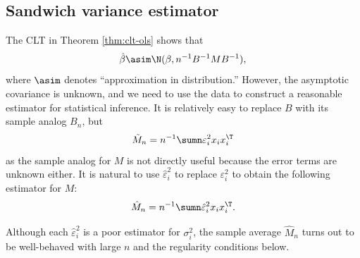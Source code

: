 \subsection{Sandwich variance estimator}
The CLT in Theorem \ref{thm:clt-ols} shows that 
\[
\hat{\beta}\asim\N(\beta,n^{-1}B^{-1}MB^{-1}),
\]
where $\asim$ denotes ``approximation in distribution.'' However,
the asymptotic covariance is unknown, and we need to use the data
to construct a reasonable estimator for statistical inference. It
is relatively easy to replace $B$ with its sample analog $B_{n}$,
but
\[
\tilde{M}_{n}=n^{-1}\sumn\varepsilon_{i}^{2}x_{i}x_{i}^{\T}
\]
as the sample analog for $M$ is not directly useful because the error
terms are unknown either. It is natural to use $\hat{\varepsilon}_{i}^{2}$
to replace $\varepsilon_{i}^{2}$ to obtain the following estimator
for $M$: 
\[
\hat{M}_{n}=n^{-1}\sumn\hat{\varepsilon}_{i}^{2}x_{i}x_{i}^{\T}.
\]

Although each $\hat{\varepsilon}_{i}^{2}$ is a poor estimator for
$\sigma_{i}^{2}$, the sample average $\hat{M}_{n}$ turns out to
be well-behaved with large $n$ and the regularity conditions below. 


